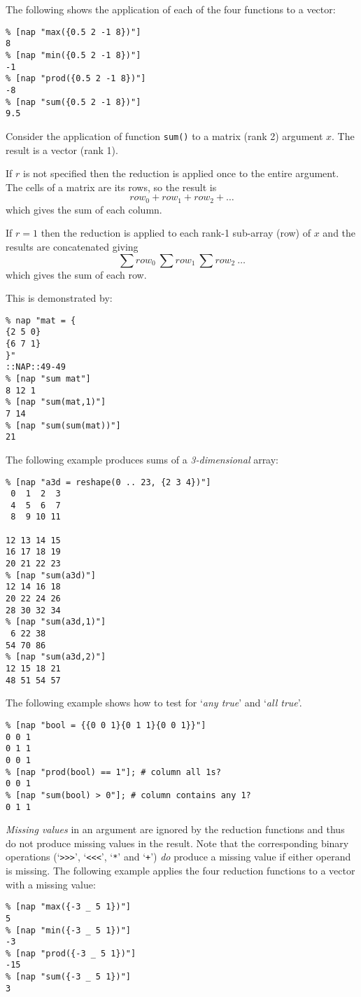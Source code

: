 The following shows the application of each of the four functions to a vector:
\begin{verbatim}
% [nap "max({0.5 2 -1 8})"]
8
% [nap "min({0.5 2 -1 8})"]
-1
% [nap "prod({0.5 2 -1 8})"]
-8
% [nap "sum({0.5 2 -1 8})"]
9.5
\end{verbatim}

Consider the application of function \texttt{sum()} to a matrix (rank 2) argument $x$.
The result is a vector (rank 1).

If $r$ is not specified then the reduction is applied once to the entire argument.
The cells of a matrix are its rows, so the result is
\[ \mathit{row}_0 + \mathit{row}_1 + \mathit{row}_2 + \ldots \]
which gives the sum of each column.

If $r=1$ then the reduction is applied to each rank-1 sub-array (row) of $x$ and the results
are concatenated giving
\[ \sum \mathit{row}_0 \ \sum \mathit{row}_1 \ \sum \mathit{row}_2 \ \ldots \]
which gives the sum of each row.

This is demonstrated by:
\begin{verbatim}
% nap "mat = {
{2 5 0}
{6 7 1}
}"
::NAP::49-49
% [nap "sum mat"]
8 12 1
% [nap "sum(mat,1)"]
7 14
% [nap "sum(sum(mat))"]
21
\end{verbatim}

The following example produces sums of a \emph{3-dimensional} array:
\begin{verbatim}
% [nap "a3d = reshape(0 .. 23, {2 3 4})"]
 0  1  2  3
 4  5  6  7
 8  9 10 11

12 13 14 15
16 17 18 19
20 21 22 23
% [nap "sum(a3d)"]
12 14 16 18
20 22 24 26
28 30 32 34
% [nap "sum(a3d,1)"]
 6 22 38
54 70 86
% [nap "sum(a3d,2)"]
12 15 18 21
48 51 54 57
\end{verbatim}

The following example shows how to test for
`\emph{any true}'
and
`\emph{all true}'.
\begin{verbatim}
% [nap "bool = {{0 0 1}{0 1 1}{0 0 1}}"]
0 0 1
0 1 1
0 0 1
% [nap "prod(bool) == 1"]; # column all 1s?
0 0 1
% [nap "sum(bool) > 0"]; # column contains any 1?
0 1 1
\end{verbatim}

\emph{Missing values} in an argument are ignored by the reduction functions
and thus do not produce missing values in the result.
Note that the corresponding binary operations
(`\texttt{>>>}', `\texttt{<<<}', `\texttt{*}' and `\texttt{+}')
\emph{do} produce a missing value if either operand is missing.
The following example applies the four reduction functions to a vector
with a missing value:
\begin{verbatim}
% [nap "max({-3 _ 5 1})"]
5
% [nap "min({-3 _ 5 1})"]
-3
% [nap "prod({-3 _ 5 1})"]
-15
% [nap "sum({-3 _ 5 1})"]
3
\end{verbatim}

